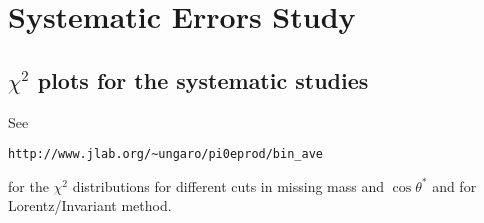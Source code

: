 \chapter{Systematic Errors Study}
\resetfootnote

\pagestyle{fancy}
\renewcommand{\sectionmark}[1]{\markright{\bfseries \slshape \thesection\ #1}{}}
\fancyhead[R]{\rightmark} 
\fancyhead[L]{\leftmark}
\fancyfoot[L]{}






\cia\vspace{-2cm}
\section{$\chi^2$ plots for the systematic studies}
See    \begin{verbatim} 
http://www.jlab.org/~ungaro/pi0eprod/bin_ave
\end{verbatim}
for the $\chi^2$ distributions for different cuts in missing mass and $\cos\theta^*$
and for Lorentz/Invariant method.


%
%




